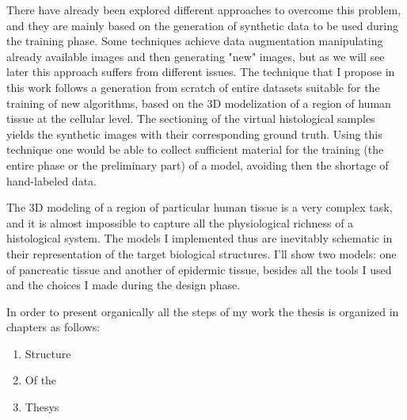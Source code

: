 There have already been explored different approaches to overcome this problem, and they are mainly based on the generation of synthetic data to be used during the training phase. Some techniques achieve data augmentation manipulating already available images and then generating "new" images, but as we will see later this approach suffers from different issues. The technique that I propose in this work follows a generation from scratch of entire datasets suitable for the training of new algorithms, based on the 3D modelization of a region of human tissue at the cellular level. The sectioning of the virtual histological samples yields the synthetic images with their corresponding ground truth. Using this technique one would be able to collect sufficient material for the training (the entire phase or the preliminary part) of a model, avoiding then the shortage of hand-labeled data.

The 3D modeling of a region of particular human tissue is a very complex task, and it is almost impossible to capture all the physiological richness of a histological system. The models I implemented thus are inevitably schematic in their representation of the target biological structures. I'll show two models: one of pancreatic tissue and another of epidermic tissue, besides all the tools I used and the choices I made during the design phase.


In order to present organically all the steps of my work the thesis is organized in chapters as follows:

\begin{enumerate}
    \item Structure

    \item Of the

    \item Thesys
\end{enumerate}



\clearpage
